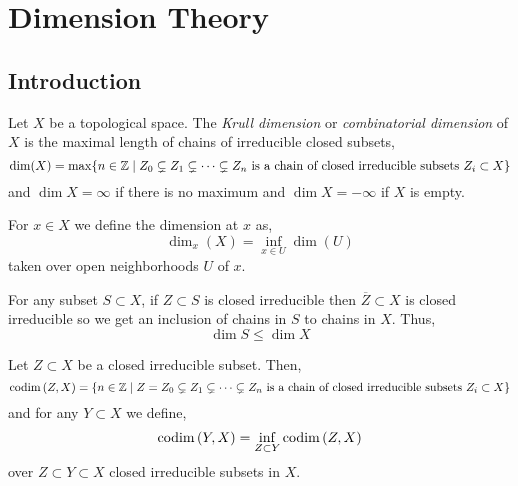 \documentclass[12pt]{article}
\begin{document}
\section{Dimension Theory}

\subsection{Introduction}

\begin{defn}
Let $X$ be a topological space. The \textit{Krull dimension} or \textit{combinatorial dimension} of $X$ is the maximal length of chains of irreducible closed subsets,
\[ \dim(X) = \max \{ n \in \mathbb{Z} \mid Z_0 \subsetneq Z_1 \subsetneq \cdots \subsetneq Z_n \text{ is a chain of closed irreducible subsets } Z_i \subset X \} \]
and $\dim{X} = \infty$ if there is no maximum and $\dim{X} = -\infty$ if $X$ is empty.
\end{defn}

\begin{defn}
For $x \in X$ we define the dimension at $x$ as,
\[ \dim_{x}(X) = \inf_{x \in U} \dim{(U)} \]
taken over open neighborhoods $U$ of $x$.
\end{defn}

\begin{rmk}
For any subset $S \subset X$, if $Z \subset S$ is closed irreducible then $\overline{Z} \subset X$ is closed irreducible so we get an inclusion of chains in $S$ to chains in $X$. Thus,
\[ \dim{S} \le \dim{X} \]
\end{rmk}

\begin{defn}
Let $Z \subset X$ be a closed irreducible subset. Then,
\[ \mathrm{codim}\left( Z,X \right) = \{ n \in \mathbb{Z} \mid Z = Z_0 \subsetneq Z_1 \subsetneq \cdots \subsetneq Z_n  \text{ is a chain of closed irreducible subsets } Z_i \subset X \} \]
and for any $Y \subset X$ we define,
\[ \mathrm{codim}\left( Y, X \right) = \inf_{Z \subset Y} \mathrm{codim}\left( Z, X \right) \]
over $Z \subset Y \subset X$ closed irreducible subsets in $X$.
\end{defn}

\begin{lemma}

\end{lemma}
\end{document}
